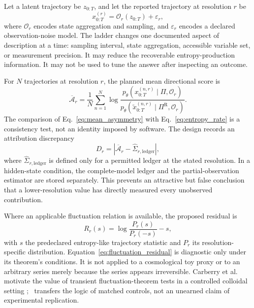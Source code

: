 Let a latent trajectory be $z_{0:T}$, and let the reported trajectory at resolution $r$ be
\begin{equation}
x^{(r)}_{0:T}=\mathcal{O}_{r}(z_{0:T})+\varepsilon_r,
\label{eq:observation_map}
\end{equation}
where $\mathcal{O}_{r}$ encodes state aggregation and sampling, and $\varepsilon_r$ encodes a declared observation-noise model. The ladder changes one documented aspect of description at a time: sampling interval, state aggregation, accessible variable set, or measurement precision. It may reduce the recoverable entropy-production information. It may not be used to tune the answer after inspecting an outcome.

For $N$ trajectories at resolution $r$, the planned mean directional score is
\begin{equation}
\overline{\mathcal{A}}_r=\frac{1}{N}\sum_{n=1}^{N}\log\frac{p_{\theta}(x^{(n,r)}_{0:T}\mid\Pi,\mathcal{O}_r)}{p_{\theta}(\tilde{x}^{(n,r)}_{0:T}\mid\Pi^{\mathrm{R}},\mathcal{O}_r)}.
\label{eq:mean_asymmetry}
\end{equation}
The comparison of Eq.~\eqref{eq:mean_asymmetry} with Eq.~\eqref{eq:entropy_rate} is a consistency test, not an identity imposed by software. The design records an attribution discrepancy
\begin{equation}
D_r=\left|\overline{\mathcal{A}}_r-\widehat{\Sigma}_{r,\mathrm{ledger}}\right|,
\label{eq:discrepancy}
\end{equation}
where $\widehat{\Sigma}_{r,\mathrm{ledger}}$ is defined only for a permitted ledger at the stated resolution. In a hidden-state condition, the complete-model ledger and the partial-observation estimator are stored separately. This prevents an attractive but false conclusion that a lower-resolution value has directly measured every unobserved contribution.

Where an applicable fluctuation relation is available, the proposed residual is
\begin{equation}
R_r(s)=\log\frac{P_r(s)}{P_r(-s)}-s,
\label{eq:fluctuation_residual}
\end{equation}
with $s$ the predeclared entropy-like trajectory statistic and $P_r$ its resolution-specific distribution. Equation~\eqref{eq:fluctuation_residual} is diagnostic only under its theorem's conditions. It is not applied to a cosmological toy proxy or to an arbitrary series merely because the series appears irreversible. Carberry et al. motivate the value of transient fluctuation-theorem tests in a controlled colloidal setting \cite{carberry2004}; \RAAT\ transfers the logic of matched controls, not an unearned claim of experimental replication.

